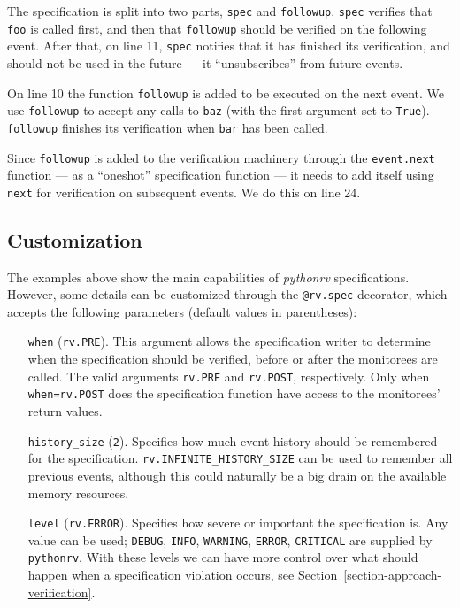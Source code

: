 The specification is split into two parts, \texttt{spec} and \texttt{followup}.
\texttt{spec} verifies that \texttt{foo} is called first, and then that
\texttt{followup} should be verified on the following event. After that, on
line 11, \texttt{spec} notifies that it has finished its verification, and
should not be used in the future --- it ``unsubscribes'' from future events.

On line 10 the function \texttt{followup} is added to be executed on the next
event. We use \texttt{followup} to accept any calls to \texttt{baz} (with the
first argument set to \texttt{True}). \texttt{followup} finishes its
verification when \texttt{bar} has been called.

Since \texttt{followup} is added to the verification machinery through the
\texttt{event.next} function --- as a ``oneshot'' specification function --- it
needs to add itself using \texttt{next} for verification on subsequent events.
We do this on line 24.



\subsection{Customization}

The examples above show the main capabilities of \textit{pythonrv}
specifications. However, some details can be customized through the
\texttt{@rv.spec} decorator, which accepts the following parameters (default
values in parentheses):

\begin{itemize}
  \item[\texttt{when}] (\texttt{rv.PRE}). This argument allows the
    specification writer to determine when the specification should be
    verified, before or after the monitorees are called. The valid arguments
    \texttt{rv.PRE} and \texttt{rv.POST}, respectively. Only when
    \texttt{when=rv.POST} does the specification function have access to the
    monitorees' return values.

  \item[\texttt{history\_size}] (\texttt{2}). Specifies how much event history
    should be remembered for the specification.
    \texttt{rv.INFINITE\_HISTORY\_SIZE} can be used to remember all previous
    events, although this could naturally be a big drain on the available
    memory resources.

  \item[\texttt{level}] (\texttt{rv.ERROR}). Specifies how severe or important
    the specification is. Any value can be used; \texttt{DEBUG}, \texttt{INFO},
    \texttt{WARNING}, \texttt{ERROR}, \texttt{CRITICAL} are supplied by
    \texttt{pythonrv}. With these levels we can have more control over what
    should happen when a specification violation occurs, see
    Section~\ref{section-approach-verification}.
\end{itemize}



